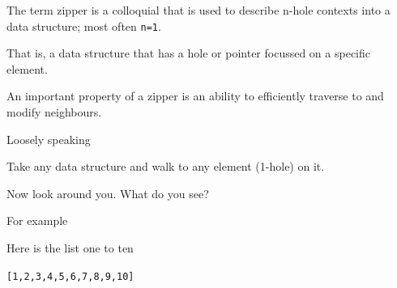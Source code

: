 
\begin{frame}
\begin{center}
The term zipper is a colloquial that is used to describe n-hole contexts into a data structure; most often \lstinline{n=1}.
\end{center}
\end{frame}

\begin{frame}
\begin{center}
That is, a data structure that has a hole or pointer focussed on a specific element.
\end{center}
\end{frame}

\begin{frame}
\begin{center}
An important property of a zipper is an ability to efficiently traverse to and modify neighbours.
\end{center}
\end{frame}

\begin{frame}
\begin{block}{Loosely speaking}
\begin{center}
Take any data structure and walk to any element (1-hole) on it.
\end{center}
\end{block}
\begin{center}
Now look around you. What do you see?
\end{center}
\end{frame}

\begin{frame}
\begin{block}{For example}
\begin{center}
Here is the list one to ten
\end{center}
\end{block}
\begin{center}
\lstinline{[1,2,3,4,5,6,7,8,9,10]}
\end{center}
\end{frame}

